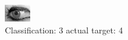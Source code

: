 \begin{figure}[h!]
\begin{center}
\includegraphics[width=0.60\columnwidth]{figures/ID2048_class_3_target_4.png}
\end{center}
\caption{ Classification: 3 actual target: 4}
\label{fig:ID2048_class_3_target_4}
\end{figure}
